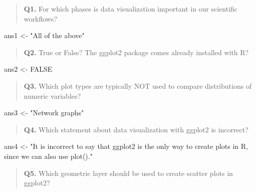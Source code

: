 \documentclass[
  letterpaper,
  DIV=11,
  numbers=noendperiod]{scrartcl}
\newenvironment{Shaded}{\begin{snugshade}}{\end{snugshade}}
\newcommand{\ConstantTok}[1]{\textcolor[rgb]{0.56,0.35,0.01}{#1}}
\newcommand{\NormalTok}[1]{\textcolor[rgb]{0.00,0.23,0.31}{#1}}
\newcommand{\OtherTok}[1]{\textcolor[rgb]{0.00,0.23,0.31}{#1}}
\newcommand{\StringTok}[1]{\textcolor[rgb]{0.13,0.47,0.30}{#1}}
\begin{document}
\begin{quote}
\textbf{Q1.} For which phases is data visualization important in our
scientific workflows?
\end{quote}

\begin{Shaded}
\begin{Highlighting}[]
\NormalTok{ans1 }\OtherTok{\textless{}{-}} \StringTok{"All of the above"}
\end{Highlighting}
\end{Shaded}

\begin{quote}
\textbf{Q2.} True or False? The ggplot2 package comes already installed
with R?
\end{quote}

\begin{Shaded}
\begin{Highlighting}[]
\NormalTok{ans2 }\OtherTok{\textless{}{-}} \ConstantTok{FALSE}
\end{Highlighting}
\end{Shaded}

\begin{quote}
\textbf{Q3.} Which plot types are typically NOT used to compare
distributions of numeric variables?
\end{quote}

\begin{Shaded}
\begin{Highlighting}[]
\NormalTok{ans3 }\OtherTok{\textless{}{-}} \StringTok{"Network graphs"}
\end{Highlighting}
\end{Shaded}

\begin{quote}
\textbf{Q4.} Which statement about data visualization with ggplot2 is
incorrect?
\end{quote}

\begin{Shaded}
\begin{Highlighting}[]
\NormalTok{ans4 }\OtherTok{\textless{}{-}} \StringTok{"It is incorrect to say that ggplot2 is the only way to create plots in R, since we can also use plot()."}
\end{Highlighting}
\end{Shaded}

\begin{quote}
\textbf{Q5.} Which geometric layer should be used to create scatter
plots in ggplot2?
\end{quote}
\end{document}
